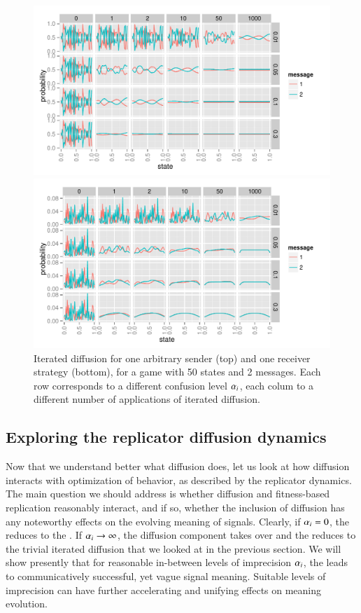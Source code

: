 \begin{figure}
  \centering

  \includegraphics[width=\textwidth]{plots/confusion_sender.pdf}
  
  \includegraphics[width=\textwidth]{plots/confusion_receiver.pdf}

  \caption{Iterated diffusion for one arbitrary sender (top) and one
    receiver strategy (bottom), for a game with 50 states and 2
    messages. Each row corresponds to a different confusion level
    $\alpha_i$, each colum to a different number of applications of
    iterated diffusion.}
  \label{fig:confusion-SenRec}
\end{figure}

\subsection{Exploring the replicator diffusion dynamics}
\label{sec:simulations}

Now that we understand better what diffusion does, let us look at how
diffusion interacts with optimization of behavior, as described by the
replicator dynamics. The main question we should address is whether
diffusion and fitness-based replication reasonably interact, and if
so, whether the inclusion of diffusion has any noteworthy effects on
the evolving meaning of signals. Clearly, if $\alpha_i = 0$, the
\rdd reduces to the \rd. If $\alpha_i \rightarrow \infty$, the
diffusion component takes over and the \rdd reduces to the trivial
iterated diffusion that we looked at in the previous section. We will
show presently that for reasonable in-between levels of imprecision
$\alpha_i$, the \rdd leads to communicatively successful, yet vague
signal meaning. Suitable levels of imprecision can have further
accelerating and unifying effects on meaning evolution.

